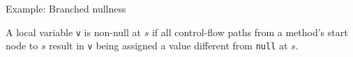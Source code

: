 \begin{slide}{Example: Branched nullness}

A local variable {\tt v} is {\red non-null} at $s$ if all control-flow
paths from a method's start node to $s$ result in {\tt v} being
assigned a value different from {\tt null} at $s$.

\begin{center}

\end{center}

\end{slide}
